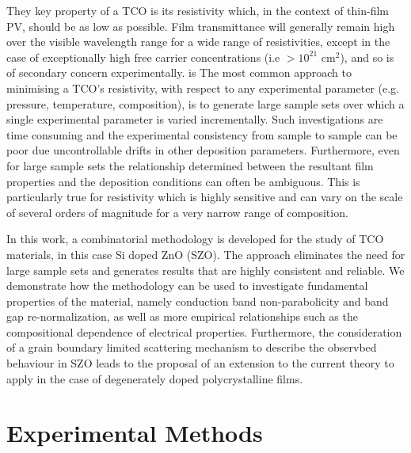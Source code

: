 \documentclass[final,5p,times]{elsarticle}
\begin{document}
They key property of a TCO is its resistivity which, in the context of thin-film PV, should be as low as possible. Film transmittance will generally remain high over the visible wavelength range for a wide range of resistivities, except in the case of exceptionally high free carrier concentrations (i.e $>10^{21}$ cm$^2$), and so is of secondary concern experimentally. is The most common approach to minimising a TCO's resistivity, with respect to any experimental parameter (e.g. pressure, temperature, composition), is to generate large sample sets over which a single experimental parameter is varied incrementally. Such investigations are time consuming and the experimental consistency from sample to sample can be poor due uncontrollable drifts in other deposition parameters. Furthermore, even for large sample sets the relationship determined between the resultant film properties and the deposition conditions can often be ambiguous. This is particularly true for resistivity which is highly sensitive and can vary on the scale of several orders of magnitude for a very narrow range of composition.

In this work, a combinatorial methodology is developed for the study of TCO materials, in this case Si doped ZnO (SZO). The approach eliminates the need for large sample sets and generates results that are highly consistent and reliable. We demonstrate how the methodology can be used to investigate fundamental properties of the material, namely conduction band non-parabolicity and band gap re-normalization, as well as more empirical relationships such as the compositional dependence of electrical properties. Furthermore, the consideration of a grain boundary limited scattering mechanism to describe the observbed behaviour in SZO leads to the proposal of an extension to the current theory to apply in the case of degenerately doped polycrystalline films.


\section{Experimental Methods}
\end{document}
